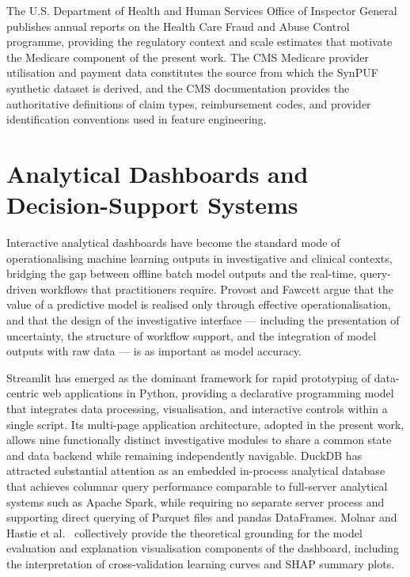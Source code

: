 The U.S. Department of Health and Human Services Office of Inspector General \cite{b16} publishes annual reports on the Health Care Fraud and Abuse Control programme, providing the regulatory context and scale estimates that motivate the Medicare component of the present work. The CMS Medicare provider utilisation and payment data \cite{b17} constitutes the source from which the SynPUF synthetic dataset is derived, and the CMS documentation provides the authoritative definitions of claim types, reimbursement codes, and provider identification conventions used in feature engineering.

\section{Analytical Dashboards and Decision-Support Systems}
\label{sec:lit-dashboard}

Interactive analytical dashboards have become the standard mode of operationalising machine learning outputs in investigative and clinical contexts, bridging the gap between offline batch model outputs and the real-time, query-driven workflows that practitioners require. Provost and Fawcett \cite{b18} argue that the value of a predictive model is realised only through effective operationalisation, and that the design of the investigative interface --- including the presentation of uncertainty, the structure of workflow support, and the integration of model outputs with raw data --- is as important as model accuracy.

Streamlit has emerged as the dominant framework for rapid prototyping of data-centric web applications in Python, providing a declarative programming model that integrates data processing, visualisation, and interactive controls within a single script. Its multi-page application architecture, adopted in the present work, allows nine functionally distinct investigative modules to share a common state and data backend while remaining independently navigable. DuckDB \cite{b17} has attracted substantial attention as an embedded in-process analytical database that achieves columnar query performance comparable to full-server analytical systems such as Apache Spark, while requiring no separate server process and supporting direct querying of Parquet files and pandas DataFrames. Molnar \cite{b19} and Hastie et al.\ \cite{b20} collectively provide the theoretical grounding for the model evaluation and explanation visualisation components of the dashboard, including the interpretation of cross-validation learning curves and SHAP summary plots.

